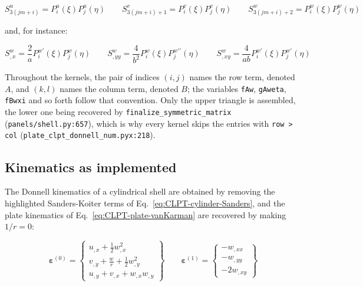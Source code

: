 \begin{equation*}
	S^u_{3(jm+i)} = P_i^u(\xi) P_j^u(\eta) \qquad
	S^v_{3(jm+i)+1} = P_i^v(\xi) P_j^v(\eta) \qquad
	S^w_{3(jm+i)+2} = P_i^w(\xi) P_j^w(\eta)
\end{equation*}

\noindent and, for instance:

\begin{equation*}
	S^w_{,x} = \frac{2}{a} P_i^{w\prime}(\xi) P_j^w(\eta) \qquad
	S^w_{,yy} = \frac{4}{b^2} P_i^w(\xi) P_j^{w\prime\prime}(\eta) \qquad
	S^w_{,xy} = \frac{4}{ab} P_i^{w\prime}(\xi) P_j^{w\prime}(\eta)
\end{equation*}

Throughout the kernels, the pair of indices $(i,j)$ names the row term, denoted $A$, and $(k,l)$ names the column term, denoted $B$; the variables \texttt{fAw}, \texttt{gAweta}, \texttt{fBwxi} and so forth follow that convention. Only the upper triangle is assembled, the lower one being recovered by \texttt{finalize\_symmetric\_matrix} (\texttt{panels/shell.py:657}), which is why every kernel skips the entries with \texttt{row > col} (\texttt{plate\_clpt\_donnell\_num.pyx:218}).

\subsection{Kinematics as implemented}\label{sec:tangent-donnell-kinematics}

The Donnell kinematics of a cylindrical shell are obtained by removing the highlighted Sanders-Koiter terms of Eq.~\ref{eq:CLPT-cylinder-Sanders}, and the plate kinematics of Eq.~\ref{eq:CLPT-plate-vanKarman} are recovered by making $1/r = 0$:

\begin{equation}\label{eq:tangent-donnell-strains}
	\boldsymbol{\varepsilon}^{(0)} = \left\{ \begin{matrix}
		u_{,x} + \frac{1}{2} w_{,x}^2 \\[2pt]
		v_{,y} + \frac{w}{r} + \frac{1}{2} w_{,y}^2 \\[2pt]
		u_{,y} + v_{,x} + w_{,x} w_{,y}
	\end{matrix} \right\}
	\qquad
	\boldsymbol{\varepsilon}^{(1)} = \left\{ \begin{matrix}
		-w_{,xx} \\[2pt] -w_{,yy} \\[2pt] -2 w_{,xy}
	\end{matrix} \right\}
\end{equation}

